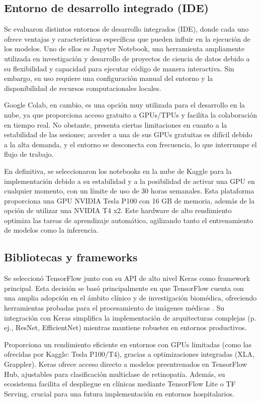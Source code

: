 \subsection{Entorno de desarrollo integrado (IDE)}

Se evaluaron distintos entornos de desarrollo integrados (IDE), donde cada uno ofrece ventajas y características específicas que pueden influir en la ejecución de los modelos. Uno de ellos es Jupyter Notebook, una herramienta ampliamente utilizada en investigación y desarrollo de proyectos de ciencia de datos debido a su flexibilidad y capacidad para ejecutar código de manera interactiva. Sin embargo, su uso requiere una configuración manual del entorno y la disponibilidad de recursos computacionales locales.

Google Colab, en cambio, es una opción muy utilizada para el desarrollo en la nube, ya que proporciona acceso gratuito a GPUs/TPUs y facilita la colaboración en tiempo real. No obstante, presenta ciertas limitaciones en cuanto a la estabilidad de las sesiones; acceder a una de sus GPUs gratuitas es difícil debido a la alta demanda, y el entorno se desconecta con frecuencia, lo que interrumpe el flujo de trabajo.

En definitiva, se seleccionaron los notebooks en la nube de Kaggle para la implementación debido a su estabilidad y a la posibilidad de activar una GPU en cualquier momento, con un límite de uso de 30 horas semanales. Esta plataforma proporciona una GPU NVIDIA Tesla P100 con 16 GB de memoria, además de la opción de utilizar una NVIDIA T4 x2. Este hardware de alto rendimiento optimiza las tareas de aprendizaje automático, agilizando tanto el entrenamiento de modelos como la inferencia.

\subsection{Bibliotecas y frameworks}

Se seleccionó TensorFlow junto con su API de alto nivel Keras como framework principal. Esta decisión se basó principalmente en que TensorFlow cuenta con una amplia adopción en el ámbito clínico y de investigación biomédica, ofreciendo herramientas probadas para el procesamiento de imágenes médicas . Su integración con Keras simplifica la implementación de arquitecturas complejas (p. ej., ResNet, EfficientNet) mientras mantiene robustez en entornos productivos.

Proporciona un rendimiento eficiente en entornos con GPUs limitadas (como las ofrecidas por Kaggle: Tesla P100/T4), gracias a optimizaciones integradas (XLA, Grappler). Keras ofrece acceso directo a modelos preentrenados en TensorFlow Hub, ajustables para clasificación multiclase de retinopatía. Además, su ecosistema facilita el despliegue en clínicas mediante TensorFlow Lite o TF Serving, crucial para una futura implementación en entornos hospitalarios.

